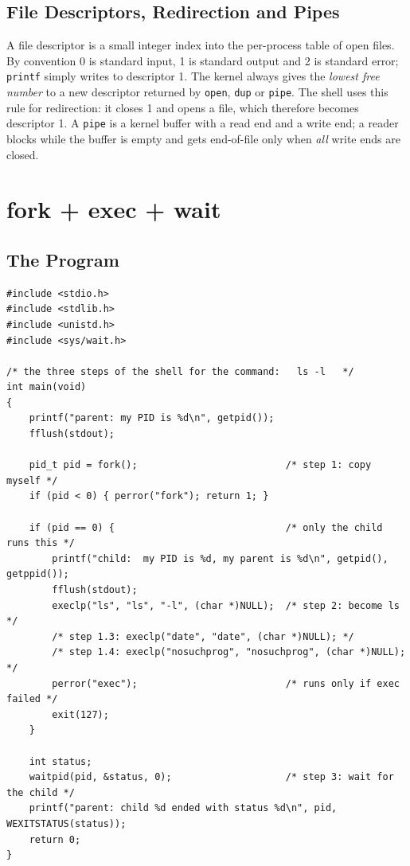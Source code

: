 \documentclass[12pt,a4paper]{article}
\begin{document}
\subsection{File Descriptors, Redirection and Pipes}

A file descriptor is a small integer index into the per-process table of open files. By convention 0 is standard input, 1 is standard output and 2 is standard error; \texttt{printf} simply writes to descriptor 1. The kernel always gives the \textit{lowest free number} to a new descriptor returned by \texttt{open}, \texttt{dup} or \texttt{pipe}. The shell uses this rule for redirection: it closes 1 and opens a file, which therefore becomes descriptor 1. A \texttt{pipe} is a kernel buffer with a read end and a write end; a reader blocks while the buffer is empty and gets end-of-file only when \textit{all} write ends are closed.

\newpage
\section{fork + exec + wait}

\subsection{The Program}

\begin{lstlisting}[style=code,caption={run.c}]
#include <stdio.h>
#include <stdlib.h>
#include <unistd.h>
#include <sys/wait.h>

/* the three steps of the shell for the command:   ls -l   */
int main(void)
{
    printf("parent: my PID is %d\n", getpid());
    fflush(stdout);

    pid_t pid = fork();                          /* step 1: copy myself */
    if (pid < 0) { perror("fork"); return 1; }

    if (pid == 0) {                              /* only the child runs this */
        printf("child:  my PID is %d, my parent is %d\n", getpid(), getppid());
        fflush(stdout);
        execlp("ls", "ls", "-l", (char *)NULL);  /* step 2: become ls */
        /* step 1.3: execlp("date", "date", (char *)NULL); */
        /* step 1.4: execlp("nosuchprog", "nosuchprog", (char *)NULL); */
        perror("exec");                          /* runs only if exec failed */
        exit(127);
    }

    int status;
    waitpid(pid, &status, 0);                    /* step 3: wait for the child */
    printf("parent: child %d ended with status %d\n", pid, WEXITSTATUS(status));
    return 0;
}
\end{lstlisting}
\end{document}
